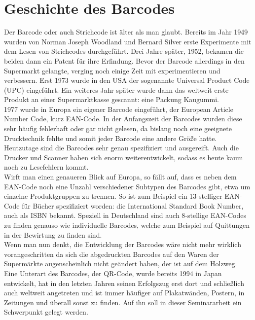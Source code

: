 \section{Geschichte des Barcodes}\label{chap:history}
Der Barcode oder auch Strichcode ist älter als man glaubt. Bereits im Jahr 1949 wurden von Norman Joseph Woodland und Bernard Silver erste Experimente mit dem Lesen von Strichcodes durchgeführt. Drei Jahre später, 1952, bekamen die beiden dann ein Patent für ihre Erfindung. 
Bevor der Barcode allerdings in den Supermarkt gelangte, verging noch einige Zeit mit experimentieren und verbessern. Erst 1973 wurde in den USA der sogenannte Universal Product Code (UPC) eingeführt. Ein weiteres Jahr später wurde dann das weltweit erste Produkt an einer Supermarktkasse gescannt: eine Packung Kaugummi.\\
1977 wurde in Europa ein eigener Barcode eingeführt, der European Article Number Code, kurz EAN-Code. 
In der Anfangszeit der Barcodes wurden diese sehr häufig fehlerhaft oder gar nicht gelesen, da bislang noch eine geeignete Drucktechnik fehlte und somit jeder Barcode eine andere Größe hatte. Heutzutage sind die Barcodes sehr genau spezifiziert und ausgereift. Auch die Drucker und Scanner haben sich enorm weiterentwickelt, sodass es heute kaum noch zu Lesefehlern kommt.\\
Wirft man einen genaueren Blick auf Europa, so fällt auf, dass es neben dem EAN-Code noch eine Unzahl verschiedener Subtypen des Barcodes gibt, etwa um einzelne Produktgruppen zu trennen. So ist zum Beispiel ein 13-stelliger EAN-Code für Bücher spezifiziert worden: die International Standard Book Number, auch als ISBN bekannt.
Speziell in Deutschland sind auch 8-stellige EAN-Codes zu finden genauso wie individuelle Barcodes, welche zum Beispiel auf Quittungen in der Bewirtung zu finden sind.\\
Wenn man nun denkt, die Entwicklung der Barcodes wäre nicht mehr wirklich vorangeschritten da sich die abgedruckten Barcodes auf den Waren der Supermärkte augenscheinlich nicht geändert haben, der ist auf dem Holzweg. \cite{Lenz2013}\\
Eine Unterart des Barcodes, der QR-Code, wurde bereits 1994 in Japan entwickelt, hat in den letzten Jahren seinen Erfolgszug erst dort und schließlich auch weltweit angetreten und ist immer häufiger auf Plakatwänden, Postern, in Zeitungen und überall sonst zu finden. Auf ihn soll in dieser Seminararbeit ein Schwerpunkt gelegt werden.


